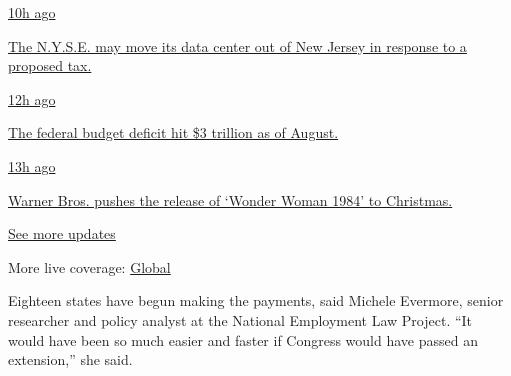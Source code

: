 \href{https://www.nytimes3xbfgragh.onion/live/2020/09/11/business/stock-market-today-coronavirus?action=click\&pgtype=Article\&state=default\&region=MAIN_CONTENT_1\&context=storylines_live_updates\#the-nyse-may-move-its-data-center-out-of-new-jersey-in-response-to-a-proposed-tax}{10h
ago}

\href{https://www.nytimes3xbfgragh.onion/live/2020/09/11/business/stock-market-today-coronavirus?action=click\&pgtype=Article\&state=default\&region=MAIN_CONTENT_1\&context=storylines_live_updates\#the-nyse-may-move-its-data-center-out-of-new-jersey-in-response-to-a-proposed-tax}{The
N.Y.S.E. may move its data center out of New Jersey in response to a
proposed tax.}

\href{https://www.nytimes3xbfgragh.onion/live/2020/09/11/business/stock-market-today-coronavirus?action=click\&pgtype=Article\&state=default\&region=MAIN_CONTENT_1\&context=storylines_live_updates\#the-federal-budget-deficit-hit-3-trillion-as-of-august}{12h
ago}

\href{https://www.nytimes3xbfgragh.onion/live/2020/09/11/business/stock-market-today-coronavirus?action=click\&pgtype=Article\&state=default\&region=MAIN_CONTENT_1\&context=storylines_live_updates\#the-federal-budget-deficit-hit-3-trillion-as-of-august}{The
federal budget deficit hit \$3 trillion as of August.}

\href{https://www.nytimes3xbfgragh.onion/live/2020/09/11/business/stock-market-today-coronavirus?action=click\&pgtype=Article\&state=default\&region=MAIN_CONTENT_1\&context=storylines_live_updates\#warner-bros-pushes-the-release-of-wonder-woman-1984-to-christmas}{13h
ago}

\href{https://www.nytimes3xbfgragh.onion/live/2020/09/11/business/stock-market-today-coronavirus?action=click\&pgtype=Article\&state=default\&region=MAIN_CONTENT_1\&context=storylines_live_updates\#warner-bros-pushes-the-release-of-wonder-woman-1984-to-christmas}{Warner
Bros. pushes the release of `Wonder Woman 1984' to Christmas.}

\href{https://www.nytimes3xbfgragh.onion/live/2020/09/11/business/stock-market-today-coronavirus?action=click\&pgtype=Article\&state=default\&region=MAIN_CONTENT_1\&context=storylines_live_updates}{See
more updates}

More live coverage:
\href{https://www.nytimes3xbfgragh.onion/2020/09/11/world/covid-19-coronavirus.html?action=click\&pgtype=Article\&state=default\&region=MAIN_CONTENT_1\&context=storylines_live_updates}{Global}

Eighteen states have begun making the payments, said Michele Evermore,
senior researcher and policy analyst at the National Employment Law
Project. ``It would have been so much easier and faster if Congress
would have passed an extension,'' she said.

